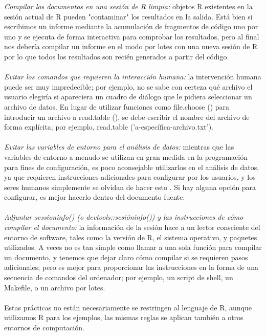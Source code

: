 \documentclass[conference]{IEEEtran}
\begin{document}
\textit{Compilar los documentos en una sesión de R limpia:} objetos R existentes en la sesión actual de R pueden "contaminar" los resultados en la salida. Está bien si escribimos un informe mediante la acumulación de fragmentos de código uno por uno y se ejecuta de forma interactiva para comprobar los resultados, pero al final nos debería compilar un informe en el modo por lotes con una nueva sesión de R por lo que todos los resultados son recién generados a partir del código.\\\\
\textit{Evitar los comandos que requieren la interacción humana:} la intervención humana puede ser muy impredecible; por ejemplo, no se sabe con certeza qué archivo el usuario elegiría si apareciera un cuadro de diálogo que le pidiera seleccionar un archivo de datos. En lugar de utilizar funciones como file.choose () para introducir un archivo a read.table (), se debe escribir el nombre del archivo de forma explícita; por ejemplo, read.table ('a-específica-archivo.txt').\\\\
\textit{Evitar las variables de entorno para el análisis de datos: }mientras que las variables de entorno a menudo se utilizan en gran medida en la programación para fines de configuración, es poco aconsejable utilizarlos en el análisis de datos, ya que requieren instrucciones adicionales para configurar por los usuarios, y los seres humanos simplemente se olvidan de hacer esto . Si hay alguna opción para configurar, es mejor hacerlo dentro del documento fuente.\\\\
\textit{Adjuntar sessioninfo() (o devtools::sesióninfo()) y las instrucciones de cómo compilar el documento: }la información de la sesión hace a un lector consciente del entorno de software, tales como la versión de R, el sistema operativo, y paquetes utilizados. A veces no es tan simple como llamar a una sola función para compilar un documento, y tenemos que dejar claro cómo compilar si se requieren pasos adicionales; pero es mejor para proporcionar las instrucciones en la forma de una secuencia de comandos del ordenador; por ejemplo, un script de shell, un Makefile, o un archivo por lotes.\\\\
Estas prácticas no están necesariamente se restringen al lenguaje de R, aunque utilizamos R para los ejemplos, las mismas reglas se aplican también a otros entornos de computación.\\\\
\end{document}
